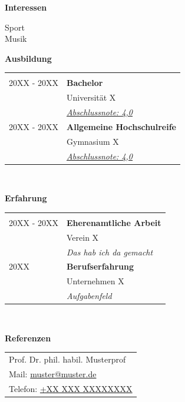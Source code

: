 \begin{vwcol}[widths={0.4,0.6}, rule=0.4pt, sep=.5em, indent=.5em]
  \begin{centering}
    \Large\textbf{Interessen}\\
  \end{centering}\normalsize
 Sport\\
  Musik\\
  \pagebreak


  \Large\textbf{Ausbildung}\\
  \normalsize
  \begin{tabular}{rl}
  & \\
  20XX - 20XX & \textbf{Bachelor}\\
  & Universität X\\
  & \textit{\hyperref[Bachelorzeugnis]{Abschlussnote: 4,0}}\\
  
  20XX - 20XX & \textbf{Allgemeine Hochschulreife}\\
  & Gymnasium X\\
  & \textit{\hyperref[Abiturzeugnis]{Abschlussnote: 4,0}}\\
  \end{tabular}\\\vspace{0.8cm}

  \Large\textbf{Erfahrung}\\
  \normalsize
  \begin{tabular}{ll}
  & \\
  20XX - 20XX & \textbf{Eherenamtliche Arbeit}\\
    & Verein X \\
    & \textit{Das hab ich da gemacht}\\
  20XX  & \textbf{Berufserfahrung}\\
    & Unternehmen X\\
    & \textit{Aufgabenfeld}\\
  \end{tabular}\\\vspace{0.8cm}

  \Large\textbf{Referenzen}\\\normalsize
  \begin{tabular}{l}
    \\
    Prof. Dr. phil. habil. Musterprof\\
    Mail: \href{mailto:muster@muster.de}{muster@muster.de}\\
    Telefon: \href{tel:+XXXXXXX}{+XX XXX XXXXXXXX}
  \end{tabular}
\end{vwcol}